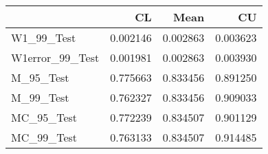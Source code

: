 \begin{tabular}{lrrr}
\toprule
{} &        CL &      Mean &        CU \\
\midrule
W1\_99\_Test      &  0.002146 &  0.002863 &  0.003623 \\
W1error\_99\_Test &  0.001981 &  0.002863 &  0.003930 \\
M\_95\_Test       &  0.775663 &  0.833456 &  0.891250 \\
M\_99\_Test       &  0.762327 &  0.833456 &  0.909033 \\
MC\_95\_Test      &  0.772239 &  0.834507 &  0.901129 \\
MC\_99\_Test      &  0.763133 &  0.834507 &  0.914485 \\
\bottomrule
\end{tabular}
